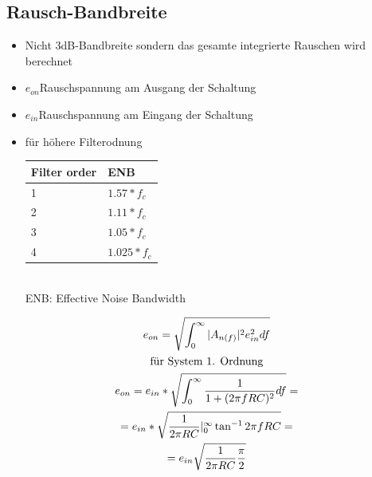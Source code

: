\subsection{Rausch-Bandbreite}
\begin{minipage}{9cm}
\begin{itemize}
  \item Nicht 3dB-Bandbreite sondern das gesamte integrierte Rauschen wird
  berechnet
  \item $e_{on}$Rauschspannung am Ausgang der Schaltung
  \item $e_{in}$Rauschspannung am Eingang der Schaltung
  \item für höhere Filterodnung\\
  \begin{tabular}{|l|l|}
  \hline
  Filter order&ENB\\\hline
  1&$1.57*f_{c}$\\\hline
  2&$1.11*f_{c}$\\\hline
  3&$1.05*f_{c}$\\\hline
  4&$1.025*f_{c}$\\\hline
  \end{tabular}\\
  ENB: Effective Noise Bandwidth
\end{itemize}

\end{minipage}
\begin{minipage}{9cm}
\begin{gather}
e_{on}=\sqrt{\int^{\infty}_{0}|A_{n(f)}|^2e^2_{in}df}\\
\text{für System 1. Ordnung}\notag\\
e_{on}=e_{in}*\sqrt{\int^{\infty}_{0}\frac{1}{1+(2\pi
fRC)^2}df}=\notag\\=e_{in}*\sqrt{\frac{1}{2\pi
RC}|^{\infty}_0\tan^{-1}2\pi fRC}=\notag\\=e_{in}\sqrt{\frac{1}{2\pi
RC}\frac{\pi}{2}}
\end{gather}
\end{minipage}

